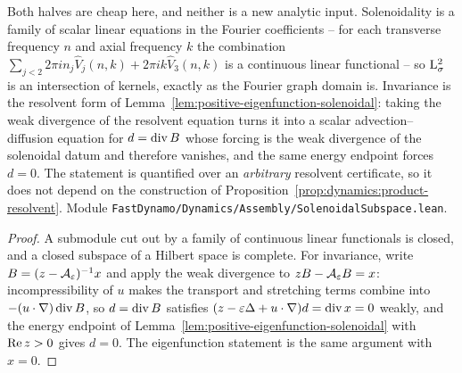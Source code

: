 Both halves are cheap here, and neither is a new analytic input.  Solenoidality is a family
of scalar linear equations in the Fourier coefficients -- for each transverse frequency $n $
and axial frequency $k $ the combination
$\sum_{j<2}2\pi in_j\widehat V_j(n,k)+2\pi ik\widehat V_3(n,k) $ is a continuous linear
functional -- so $\mathrm{L}^2_\sigma $ is an intersection of kernels, exactly as the Fourier graph
domain is.  Invariance is the resolvent form of
Lemma~\ref{lem:positive-eigenfunction-solenoidal}: taking the weak divergence of the
resolvent equation turns it into a scalar advection--diffusion equation for $d=\operatorname{div} B $ whose
forcing is the weak divergence of the solenoidal datum and therefore vanishes, and the same
energy endpoint forces $d=0 $.  The statement is quantified over an \emph{arbitrary}
resolvent certificate, so it does not depend on the construction of
Proposition~\ref{prop:dynamics:product-resolvent}.  Module
\texttt{FastDynamo/Dynamics/Assembly/SolenoidalSubspace.lean}.

\begin{proof}
  \leanok
  A submodule cut out by a family of continuous linear functionals is closed, and a closed
  subspace of a Hilbert space is complete.  For invariance, write $B=(z-\mathcal A_\varepsilon)^{-1}x $
  and apply the weak divergence to $zB-\mathcal A_\varepsilon B=x $: incompressibility of $u $ makes
  the transport and stretching terms combine into $-(u\cdot\nabla)\operatorname{div} B $, so
  $d=\operatorname{div} B $ satisfies $(z-\varepsilon\Delta+u\cdot\nabla)d=\operatorname{div} x=0 $ weakly, and the energy
  endpoint of Lemma~\ref{lem:positive-eigenfunction-solenoidal} with $\operatorname{Re} z>0 $ gives $d=0 $.
  The eigenfunction statement is the same argument with $x=0 $.
\end{proof}

